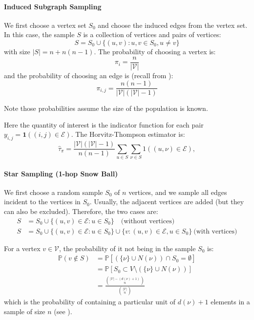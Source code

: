 \documentclass{article}
\begin{document}
\paragraph{Induced Subgraph Sampling} We first choose a vertex set $S_0$ and choose the induced edges from the vertex set. In this case, the sample $S$ is a collection of vertices and pairs of vertices:
\begin{equation*}
    S = S_0 \cup \{(u,v): u,v\in S_0, u\neq v\}
\end{equation*}
with size $|S|=n+n(n-1)$. The probability of choosing a vertex is:
\begin{equation*}
    \pi_i = \frac{n}{|\mathcal{V}|}
\end{equation*}
and the probability of choosing an edge is (recall from ):
\begin{equation*}
    \pi_{i,j} = \frac{n(n-1)}{|\mathcal{V}|(|\mathcal{V}|-1)}
\end{equation*}

Note those probabilities assume the size of the population is known.  


\begin{example}
    Here the quantity of interest is the indicator function for each pair $y_{i,j}=\mathbf{1}((i,j)\in \mathcal{E})$. The Horvitz-Thompson estimator is:
    \begin{equation*}
        \hat{\tau}_{\pi}=\frac{|\mathcal{V}|(|\mathcal{V}|-1)}{n(n-1)}\sum_{u\in S}\sum_{\nu\in S}1((u,\nu)\in\mathcal{E}),
    \end{equation*}
\end{example}

\paragraph{Star Sampling (1-hop Snow Ball)} We first choose a random sample $S_0$ of $n$ vertices, and we sample all edges incident to the vertices in $S_0$. Usually, the adjacent vertices are added (but they can also be excluded). Therefore, the two cases are:
\begin{align*}
    S &= S_0\cup \{(u,v)\in \mathcal{E}: u\in S_0\}\quad \text{(without vertices)}\\
    S &= S_0\cup \{(u,v)\in \mathcal{E}: u\in S_0\} \cup \{v: (u,v)\in \mathcal{E}, u\in S_0\} \ \text{(with vertices)}
\end{align*}
\begin{example}
    For a vertex $v\in \mathcal{V}$, the probability of it not being in the sample $S_0$ is:
    \begin{align*}
        \mathbb{P}(v\notin S) &= \mathbb{P}[\left(\{\nu\}\cup N(\nu)\right)\cap S_{0}=\emptyset]\\
        &= \mathbb{P}[S_{0}\subset V\setminus(\{\nu\}\cup N(\nu))]\\
        &= \frac{\binom{|\mathcal{V}|-(d(\nu)+1)}{n}}{\binom{|\mathcal{V}|}{n}}
    \end{align*}
    which is the probability of containing a particular unit of $d(\nu)+1$ elements in a sample of size $n$ (see ).
\end{example}
\end{document}
